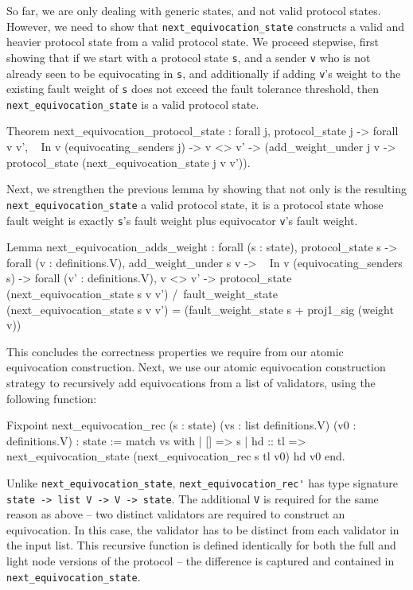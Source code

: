 \documentclass[runningheads]{llncs}
\begin{document}
So far, we are only dealing with generic states, and not valid protocol states. However, we need to show that \verb|next_equivocation_state| constructs a valid and heavier protocol state from a valid protocol state. We proceed stepwise, first showing that if we start with a protocol state \verb|s|, and a sender \verb|v| who is not already seen to be equivocating in \verb|s|, and additionally if adding \verb|v|'s weight to the existing fault weight of \verb|s| does not exceed the fault tolerance threshold, then \verb|next_equivocation_state| is a valid protocol state.
\begin{coq}
Theorem next_equivocation_protocol_state :
	forall j,
	protocol_state j ->
	forall v v',
	~ In v (equivocating_senders j) -> 
	v <> v' -> 
	(add_weight_under j v ->
	protocol_state (next_equivocation_state j v v')).
\end{coq} 	
Next, we strengthen the previous lemma by showing that not only is the resulting \verb|next_equivocation_state| a valid protocol state, it is a protocol state whose fault weight is exactly \verb|s|'s fault weight plus equivocator \verb|v|'s fault weight. 
\begin{coq}
	Lemma next_equivocation_adds_weight :
	forall (s : state),
	protocol_state s ->
	forall (v : definitions.V),
	add_weight_under s v ->
	~ In v (equivocating_senders s) -> 
	forall (v' : definitions.V),
	v <> v' ->
	protocol_state (next_equivocation_state s v v') /\
	fault_weight_state (next_equivocation_state s v v') =
	(fault_weight_state s + proj1_sig (weight v))%
\end{coq}	
This concludes the correctness properties we require from our atomic equivocation construction. Next, we use our atomic equivocation construction strategy to recursively add equivocations from a list of validators, using the following function: 
\begin{coq}
Fixpoint next_equivocation_rec (s : state) 
															(vs : list definitions.V) 
															(v0 : definitions.V) : state :=
	match vs with
	| [] => s
	| hd :: tl => next_equivocation_state (next_equivocation_rec s tl v0) 
																				hd 
																				v0
	end.
\end{coq}
Unlike \verb|next_equivocation_state|, \verb|next_equivocation_rec'| has type signature \verb|state -> list V -> V -> state|. The additional \verb|V| is required for the same reason as above -- two distinct validators are required to construct an equivocation. In this case, the validator has to be distinct from each validator in the input list. This recursive function is defined identically for both the full and light node versions of the protocol -- the difference is captured and contained in \verb|next_equivocation_state|. 
\end{document}
